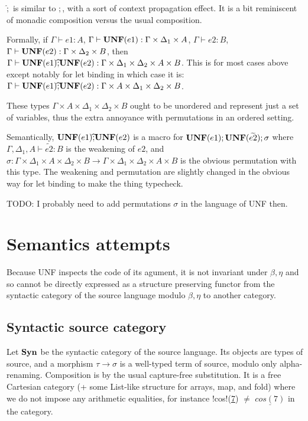 $\widehat{;}$ is similar to $;$, with a sort of context propagation effect. 
It is a bit reminiscent of monadic composition versus the usual composition.

Formally, if $\Gamma\vdash e1: A$, $\Gamma\vdash \mathbf{UNF}(e1): \Gamma\times\Delta_1\times A$, $\Gamma\vdash e2: B$, $\Gamma\vdash \mathbf{UNF}(e2): \Gamma\times\Delta_2\times B$, then $\Gamma\vdash \mathbf{UNF}(e1) \widehat{;} \mathbf{UNF}(e2): \Gamma\times \Delta_1\times \Delta_2 \times A \times B$.
This is for most cases above except notably for let binding in which case it is: 
 $\Gamma\vdash \mathbf{UNF}(e1) \widehat{;} \mathbf{UNF}(e2): \Gamma\times A \times \Delta_1\times \Delta_2 \times B$. 

 These types $\Gamma\times A \times \Delta_1\times \Delta_2 \times B$ ought to be unordered and represent just a set of variables, thus the extra annoyance with permutations in an ordered setting. 

 Semantically, $\mathbf{UNF}(e1) \widehat{;} \mathbf{UNF}(e2)$ is a macro for $\mathbf{UNF}(e1) ; \mathbf{UNF}(\widetilde{e2}); \sigma$ where $\Gamma,\Delta_1,A\vdash \widetilde{e2}:B$ is the weakening of $e2$, and $\sigma: \Gamma\times\Delta_1\times A \times \Delta_2 \times B \to \Gamma\times\Delta_1\times \Delta_2 \times A\times B$ is the obvious permutation with this type.
The weakening and permutation are slightly changed in the obvious way for let binding to make the thing typecheck. 


 TODO: I probably need to add permutations $\sigma$ in the language of UNF then.


\section{Semantics attempts}

Because UNF inspects the code of its agument, it is not invariant under $\beta,\eta$ and so cannot be directly expressed as a structure preserving functor from the syntactic category of the source language modulo $\beta,\eta$ to another category. 

\subsection{Syntactic source category}

Let $\mathbf{Syn}$ be the syntactic category of the source language. Its objects are types of source, and a morphism $\tau \to \sigma$ is a well-typed term of source, modulo only alpha-renaming. Composition is by the usual capture-free substitution. It is a free Cartesian category (+ some List-like structure for arrays, map, and fold) where we do not impose any arithmetic equalities, for instance !cos!(\underline{7}) $\neq$ $\underline{cos(7)}$ in the category.


